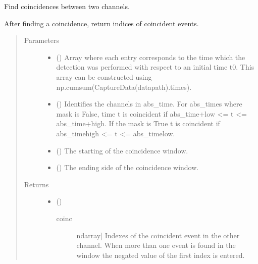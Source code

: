 \documentclass[letterpaper,10pt,english]{sphinxmanual}
\begin{document}

\begin{fulllineitems}
\label{\detokenize{tes:tes.counts.coincidence}}
\sphinxAtStartPar
Find coincidences between two channels.

\sphinxAtStartPar
After finding a coincidence, return indices of coincident events.
\begin{quote}\begin{description}
\item[{Parameters}] \leavevmode\begin{itemize}
\item {} 
\sphinxAtStartPar
{} () \textendash{} Array where each entry corresponds to the time which the
detection was performed with respect to an initial time t0.
This array can be constructed using
np.cumsum(CaptureData(datapath).times).

\item {} 
\sphinxAtStartPar
{} () \textendash{} Identifies the channels in abs\_time.
For abs\_times where mask is False, time t is coincident if
abs\_time+low \textless{}= t \textless{}= abs\_time+high.
If the mask is True t is coincident if
abs\_time\sphinxhyphen{}high \textless{}= t \textless{}= abs\_time\sphinxhyphen{}low.

\item {} 
\sphinxAtStartPar
{} () \textendash{} The starting of the coincidence window.

\item {} 
\sphinxAtStartPar
{} () \textendash{} The ending side of the coincidence window.

\end{itemize}

\item[{Returns}] \leavevmode
\sphinxAtStartPar
\begin{itemize}
\item {} 
\sphinxAtStartPar
{} () \textendash{}
\begin{description}
\item[{coinc}] \leavevmode{[}ndarray{]}
\sphinxAtStartPar
Indexes of the coincident event in the other channel.
When more than one event is found in the window the negated
value of the first index is entered.


\end{description}
\end{itemize}
\end{description}
\end{quote}
\end{fulllineitems}
\end{document}
